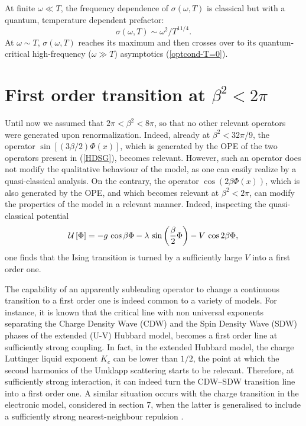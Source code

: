 At finite $\omega \ll T$, the frequency dependence of $\sigma (\omega, T)$
is classical but with a quantum, temperature dependent prefactor:
$$
\sigma (\omega, T) \sim \omega^2 / T^{11/4}.
$$
At $\omega \sim T$, $\sigma (\omega, T)$ reaches its maximum and then crosses over
to its quantum-critical high-frequency ($\omega \gg T$) asymptotics
(\ref{optcond-T=0}).

\section{First order transition at $\beta^2<2\pi$}

Until now we assumed that $2\pi <\beta^2<8\pi$, so that no
other relevant operators were generated upon renormalization.
Indeed, already at $\beta^2<32\pi/9$, the operator
$\sin\left[\left(3\beta/2\right)\Phi(x)\right]$, which is
generated by the OPE of the two operators present in
(\ref{HDSG}), becomes relevant. However, such an operator
does not modify the qualitative behaviour of the model, as
one can easily realize by a quasi-classical analysis.
On the contrary, the operator $\cos\left(2\beta\Phi(x)\right)$,
which is also generated by the OPE, and which becomes
relevant at $\beta^2<2\pi$, can modify the
properties of the model in a relevant manner. Indeed,
inspecting the quasi-classical potential
\[
{\cal{U}}\left[\Phi\right] = - g\,\cos\beta\Phi -
\lambda\, \sin\left(\frac{\beta}{2}\Phi\right)
- V\, \cos 2\beta\Phi,
\]
one finds that the Ising transition is turned by a
sufficiently large $V$ into a first order one.

The capability of an apparently subleading operator to change a
continuous transition to a first order one is indeed common to a variety
of models. For instance, it is known that the critical
line with non universal exponents separating
the Charge Density Wave (CDW) and the Spin Density Wave (SDW) phases of the
extended (U-V) Hubbard model, becomes a first order line at sufficiently
strong coupling\cite{Hirsh}. In fact, in the extended Hubbard model,
the charge Luttinger liquid exponent $K_c$ can be lower than $1/2$,
the point at which the second harmonics of the Umklapp scattering
starts to be relevant. Therefore, at sufficiently strong interaction, it
can indeed turn the CDW--SDW transition line into a first order one.
A similar situation occurs with the charge transition in the
electronic model, considered in section 7, when the latter is generalised
to include a sufficiently strong nearest-neighbour repulsion \cite{nagaosa}.

